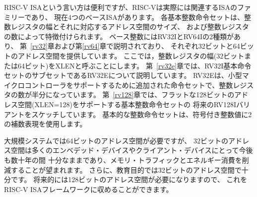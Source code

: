 RISC-V ISAという言い方は便利ですが、RISC-Vは実際には関連するISAのファミリーであり、
現在4つのベースISAがあります。 
各基本整数命令セットは、整数レジスタの幅とそれに対応するアドレス空間のサイズ、
および整数レジスタの数によって特徴付けられます。 
ベース整数にはRV32IとRV64Iの2種類があり、
第~\ref{rv32}章および第\ref{rv64}章で説明されており、
それぞれ32ビットと64ビットのアドレス空間を提供しています。
ここでは，整数レジスタの幅(32ビットまたは64ビット)をXLENと呼ぶことにします。
第~\ref{rv32e}章では、RV32I基本命令セットのサブセットであるRV32Eについて説明しています。
RV32Eは、小型マイクロコントローラをサポートするために追加された命令セットで、整数レジスタの数が半分になっています。
第~\ref{rv128}章では、フラットな128ビットのアドレス空間(XLEN=128)をサポートする基本整数命令セットの
将来のRV128Iバリアントをスケッチしています。
基本的な整数命令セットは、符号付き整数値に2の補数表現を使用します。

\begin{comment}
\begin{commentary}
Although 64-bit address spaces are a requirement for larger systems,
we believe 32-bit address spaces will remain adequate for many
embedded and client devices for decades to come and will be desirable
to lower memory traffic and energy consumption.  In addition, 32-bit
address spaces are sufficient for educational purposes.  A larger flat
128-bit address space might eventually be required, so we ensured this
could be accommodated within the RISC-V ISA framework.
\end{commentary}
\end{comment}

\begin{commentary}
大規模システムでは64ビットのアドレス空間が必要ですが、
32ビットのアドレス空間は多くのエンベデッド・デバイスやクライアント・デバイスにとって今後も数十年の間
十分なままであり、メモリ・トラフィックとエネルギー消費を削減することが望まれます。
さらに、教育目的では32ビットのアドレス空間で十分です。
将来的には128ビットのアドレス空間が必要になりますので、
これをRISC-V ISAフレームワークに収めることができます。
\end{commentary}

